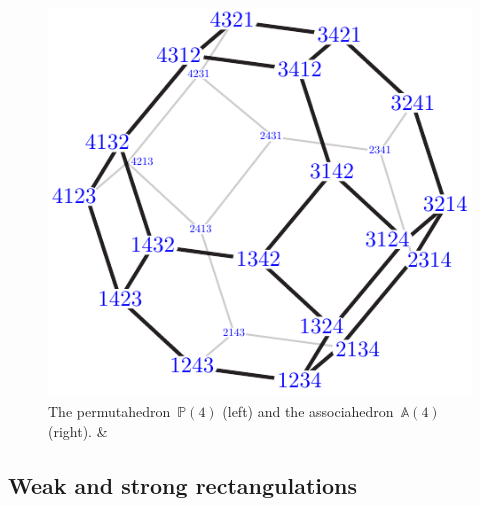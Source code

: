\documentclass{amsart}
\theoremstyle{definition}
\newcommand{\polytope}[1]{\mathds{#1}} %
\newcommand{\Perm}{\polytope{P}} %
\newcommand{\Asso}{\polytope{A}} %
\begin{document}
\begin{figure}
	\capstart
	\centerline{\includegraphics[scale=.75]{permutahedronLeft4} \quad {}}
	\caption{The permutahedron~$\Perm(4)$ (left) and the associahedron~$\Asso(4)$ (right). \cite[Fig.~1]{MR3964495} \&~\cite[Fig.~5]{MR4584712}}
	\label{fig:quotientopes}
\end{figure}


\subsection{Weak and strong rectangulations}
\end{document}
